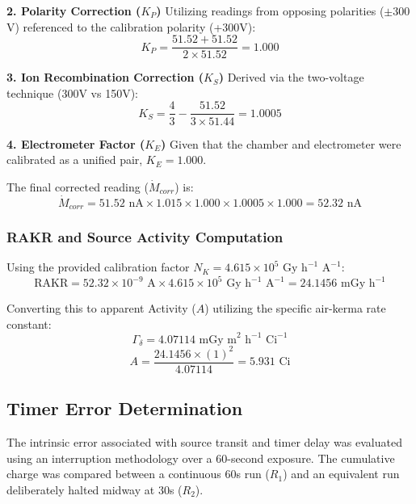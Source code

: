 \textbf{2. Polarity Correction ($K_P$)}
Utilizing readings from opposing polarities ($\pm 300$V) referenced to the calibration polarity (+300V):
\begin{equation}
K_P = \frac{51.52 + 51.52}{2 \times 51.52} = 1.000
\end{equation}

\textbf{3. Ion Recombination Correction ($K_S$)}
Derived via the two-voltage technique (300V vs 150V):
\begin{equation}
K_S = \frac{4}{3} - \frac{51.52}{3 \times 51.44} = 1.0005
\end{equation}

\textbf{4. Electrometer Factor ($K_E$)}
Given that the chamber and electrometer were calibrated as a unified pair, $K_E = 1.000$.

The final corrected reading ($\dot{M}_{corr}$) is:
\begin{equation}
\dot{M}_{corr} = 51.52 \text{ nA} \times 1.015 \times 1.000 \times 1.0005 \times 1.000 = 52.32 \text{ nA}
\end{equation}

\subsubsection{RAKR and Source Activity Computation}
Using the provided calibration factor $N_K = 4.615 \times 10^5 \text{ Gy h}^{-1} \text{ A}^{-1}$:
\begin{equation}
\text{RAKR} = 52.32 \times 10^{-9} \text{ A} \times 4.615 \times 10^5 \text{ Gy h}^{-1} \text{ A}^{-1} = 24.1456 \text{ mGy h}^{-1}
\end{equation}

Converting this to apparent Activity ($A$) utilizing the specific air-kerma rate constant: $$\Gamma_\delta = 4.07114 \text{ mGy m}^2 \text{ h}^{-1} \text{ Ci}^{-1}$$
\begin{equation}
A = \frac{24.1456 \times (1)^2}{4.07114} = 5.931 \text{ Ci}
\end{equation}

\subsection{Timer Error Determination}
The intrinsic error associated with source transit and timer delay was evaluated using an interruption methodology over a 60-second exposure. The cumulative charge was compared between a continuous 60s run ($R_1$) and an equivalent run deliberately halted midway at 30s ($R_2$).

